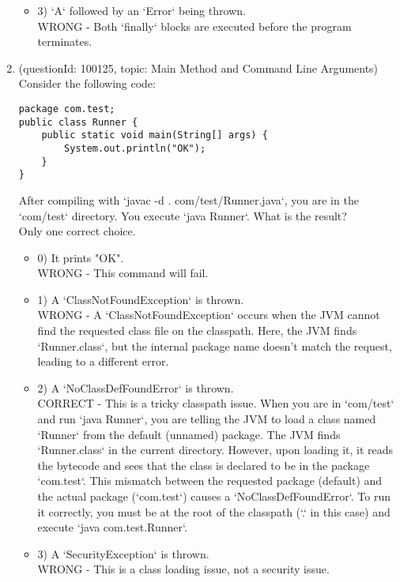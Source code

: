 \documentclass[12pt]{article}
\begin{document}
\begin{enumerate}[label=(\arabic*)]
\begin{itemize}
\item 3) `A` followed by an `Error` being thrown.
 \\ 
WRONG - Both `finally` blocks are executed before the program terminates.

\end{itemize}
\item (questionId: 100125, topic: Main Method and Command Line Arguments) \\ 
Consider the following code:
\begin{verbatim}
package com.test;
public class Runner {
    public static void main(String[] args) {
        System.out.println("OK");
    }
}
\end{verbatim}
After compiling with `javac -d . com/test/Runner.java`, you are in the `com/test` directory. You execute `java Runner`. What is the result?
\\ \noindent Only one correct choice. 
\begin{itemize}
\item 0) It prints "OK".
 \\ 
WRONG - This command will fail.

\item 1) A `ClassNotFoundException` is thrown.
 \\ 
WRONG - A `ClassNotFoundException` occurs when the JVM cannot find the requested class file on the classpath. Here, the JVM finds `Runner.class`, but the internal package name doesn't match the request, leading to a different error.

\item 2) A `NoClassDefFoundError` is thrown.
 \\ 
CORRECT - This is a tricky classpath issue. When you are in `com/test` and run `java Runner`, you are telling the JVM to load a class named `Runner` from the default (unnamed) package. The JVM finds `Runner.class` in the current directory. However, upon loading it, it reads the bytecode and sees that the class is declared to be in the package `com.test`. This mismatch between the requested package (default) and the actual package (`com.test`) causes a `NoClassDefFoundError`. To run it correctly, you must be at the root of the classpath (`.` in this case) and execute `java com.test.Runner`.

\item 3) A `SecurityException` is thrown.
 \\ 
WRONG - This is a class loading issue, not a security issue.


\end{itemize}
\end{enumerate}
\end{document}
